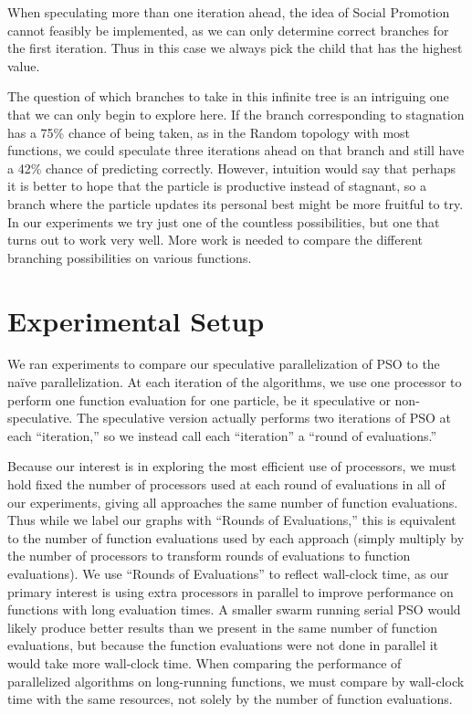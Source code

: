 \documentclass[smallcondensed]{svjour3}
\begin{document}
When speculating more than one iteration ahead, the idea of Social Promotion
cannot feasibly be implemented, as we can only determine correct branches for
the first iteration.  Thus in this case we always pick the child that has the
highest value.

The question of which branches to take in this infinite tree is an intriguing
one that we can only begin to explore here.  If the branch corresponding to
stagnation has a 75\% chance of being taken, as in the Random topology with
most functions, we could speculate three iterations ahead on that branch and
still have a 42\% chance of predicting correctly.  However, intuition would say
that perhaps it is better to hope that the particle is productive instead of
stagnant, so a branch where the particle updates its personal best might be
more fruitful to try.  In our experiments we try just one of the countless
possibilities, but one that turns out to work very well.  More work is needed
to compare the different branching possibilities on various functions.

\section{Experimental Setup}
\label{sec:setup}

We ran experiments to compare our speculative parallelization of PSO to the
na\"ive parallelization.  At each iteration of the algorithms, we use one
processor to perform one function evaluation for one particle, be it
speculative or non-speculative.  The speculative version actually performs
two iterations of PSO at each ``iteration,'' so we instead call each
``iteration'' a ``round of evaluations.''

Because our interest is in exploring the most efficient use of processors, we
must hold fixed the number of processors used at each round of evaluations in
all of our experiments, giving all approaches the same number of function
evaluations.  Thus while we label our graphs with ``Rounds of Evaluations,''
this is equivalent to the number of function evaluations used by each approach
(simply multiply by the number of processors to transform rounds of evaluations
to function evaluations).  We use ``Rounds of Evaluations'' to reflect
wall-clock time, as our primary interest is using extra processors in parallel
to improve performance on functions with long evaluation times.  A smaller
swarm running serial PSO would likely produce better results than we present in
the same number of function evaluations, but because the function evaluations
were not done in parallel it would take more wall-clock time.  When comparing
the performance of parallelized algorithms on long-running functions, we must
compare by wall-clock time with the same resources, not solely by the number of
function evaluations.
\end{document}
